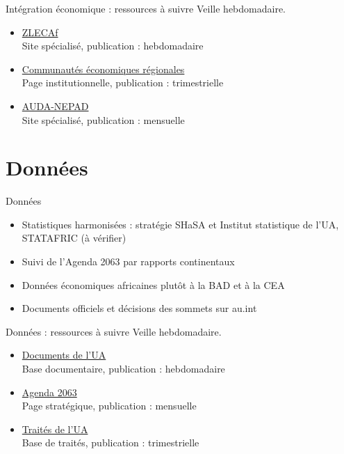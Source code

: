 \documentclass[aspectratio=169,11pt]{beamer}
\begin{document}
\begin{frame}{Intégration économique : ressources à suivre}
\small
Veille hebdomadaire.
\begin{itemize}
\item \href{https://au-afcfta.org}{ZLECAf}\\{\footnotesize Site spécialisé, publication : hebdomadaire}
\item \href{https://au.int/en/recs}{Communautés économiques régionales}\\{\footnotesize Page institutionnelle, publication : trimestrielle}
\item \href{https://www.nepad.org}{AUDA-NEPAD}\\{\footnotesize Site spécialisé, publication : mensuelle}
\end{itemize}
\end{frame}

\section{Données}
\begin{frame}{Données}
\begin{itemize}
\item Statistiques harmonisées : stratégie SHaSA et Institut statistique de l'UA, STATAFRIC (à vérifier)
\item Suivi de l'Agenda 2063 par rapports continentaux
\item Données économiques africaines plutôt à la BAD et à la CEA
\item Documents officiels et décisions des sommets sur au.int
\end{itemize}
\end{frame}

\begin{frame}{Données : ressources à suivre}
\small
Veille hebdomadaire.
\begin{itemize}
\item \href{https://au.int/en/documents}{Documents de l'UA}\\{\footnotesize Base documentaire, publication : hebdomadaire}
\item \href{https://au.int/en/agenda2063/overview}{Agenda 2063}\\{\footnotesize Page stratégique, publication : mensuelle}
\item \href{https://au.int/en/treaties}{Traités de l'UA}\\{\footnotesize Base de traités, publication : trimestrielle}
\end{itemize}
\end{frame}
\end{document}
